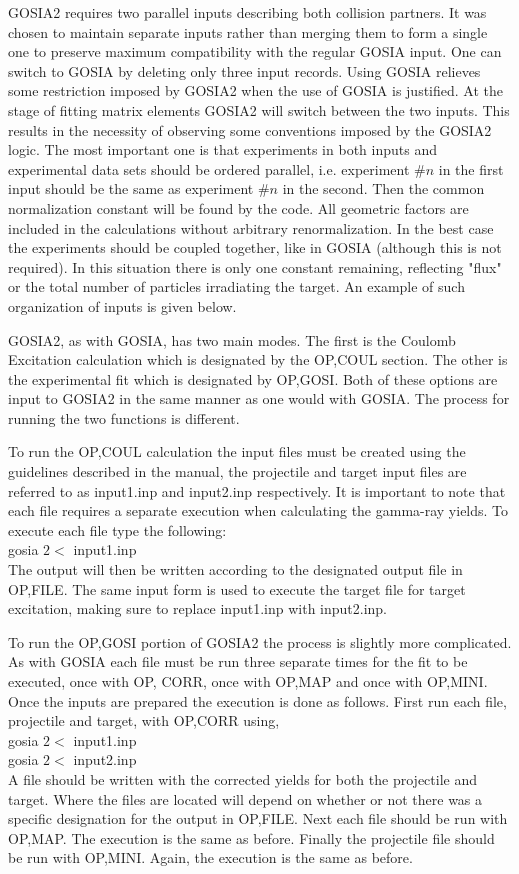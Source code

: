 \documentclass[10pt]{article}
\begin{document}
GOSIA2 requires two parallel inputs describing both collision partners. It was chosen to maintain separate inputs rather than merging them to form a single one to preserve maximum compatibility with the regular GOSIA input. One can switch to GOSIA by deleting only three input records. Using GOSIA relieves some restriction imposed by GOSIA2 when the use of GOSIA is justified. At the stage of fitting matrix elements GOSIA2 will switch between the two inputs. This results in the necessity of observing some conventions imposed by the GOSIA2 logic. The most important one is that experiments in both inputs and experimental data sets should be ordered parallel, i.e. experiment $\# n$ in the first input should be the same as experiment $\# n$ in the second. Then the common normalization constant will be found by the code. All geometric factors are included in the calculations without arbitrary renormalization. In the best case the experiments should be coupled together, like in GOSIA (although this is not required). In this situation there is only one constant remaining, reflecting "flux" or the total number of particles irradiating the target. An example of such organization of inputs is given below.

GOSIA2, as with GOSIA, has two main modes. The first is the Coulomb Excitation calculation which is designated by the OP,COUL section. The other is the experimental fit which is designated by OP,GOSI. Both of these options are input to GOSIA2 in the same manner as one would with GOSIA. The process for running the two functions is different.

To run the OP,COUL calculation the input files must be created using the guidelines described in the manual, the projectile and target input files are referred to as input1.inp and input2.inp respectively. It is important to note that each file requires a separate execution when calculating the gamma-ray yields. To execute each file type the following:\\
gosia $2<$ input1.inp\\
The output will then be written according to the designated output file in OP,FILE. The same input form is used to execute the target file for target excitation, making sure to replace input1.inp with input2.inp.

To run the OP,GOSI portion of GOSIA2 the process is slightly more complicated. As with GOSIA each file must be run three separate times for the fit to be executed, once with OP, CORR, once with OP,MAP and once with OP,MINI. Once the inputs are prepared the execution is done as follows. First run each file, projectile and target, with OP,CORR using,\\
gosia $2<$ input1.inp\\
gosia $2<$ input2.inp\\
A file should be written with the corrected yields for both the projectile and target. Where the files are located will depend on whether or not there was a specific designation for the output in OP,FILE. Next each file should be run with OP,MAP. The execution is the same as before. Finally the projectile file should be run with OP,MINI. Again, the execution is the same as before.
\end{document}
